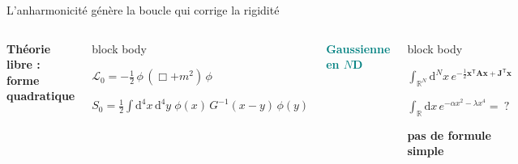 \documentclass[aspectratio=169,10pt,t]{beamer}
\newcommand{\tagline}[2]{\textcolor{#1}{\bfseries #2}}
\begin{document}
{
\begin{frame}[label=slide13-closed]{L'anharmonicité génère la boucle qui corrige la rigidité}
  \begin{columns}[T,onlytextwidth]
      \tagline{CSOrange}{Théorie libre : forme quadratique}\par
      \vspace{0.03cm}
      \begin{beamercolorbox}[rounded=true,sep=0.20em]{block body}
        \centering
        {\fontsize{7.9}{9.4}\selectfont
        \(\displaystyle
          \mathcal L_0=
          -\frac12\,\phi\,(\Box+m^2)\,\phi
        \)\par
        \vspace{0.06cm}
        \(\displaystyle
          S_0=\frac12\int\!\mathrm d^4x\,\mathrm d^4y\;
          \phi(x)\,G^{-1}(x-y)\,\phi(y)
        \)}
      \end{beamercolorbox}

      \vspace{0.72cm}
      \centering

      \tagline{Teal}{Gaussienne en $N$D}\par
      \vspace{0.03cm}
      \begin{beamercolorbox}[rounded=true,sep=0.20em]{block body}
        \centering
        {\fontsize{7.2}{8.6}\selectfont
        \(\displaystyle
          \int_{\mathbb R^N}\!\mathrm d^N x\,
          e^{-\frac12\bm x^{\mathsf T}\bm A\bm x
             +\bm J^{\mathsf T}\bm x}
        \)\par
        \vspace{0.14cm}
        {\color{bordeauCS}\fontsize{6.65}{7.45}\selectfont
          \(\int_{\mathbb R}\!\mathrm dx\,e^{-\alpha x^2- \lambda x^4} =\ ?\)\par
          \vspace{-0.01cm}\textbf{pas de formule simple}}
        }
      \end{beamercolorbox}
  \end{columns}


\end{frame}}
\end{document}
